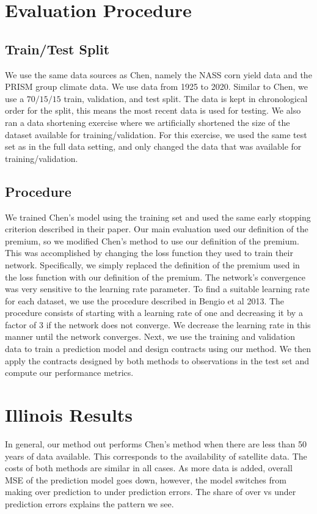 \documentclass[11pt]{article}
\begin{document}
\section{Evaluation Procedure}
  \subsection{Train/Test Split}
    We use the same data sources as Chen, namely the NASS corn yield data and the PRISM group climate data. We use data from 1925 to 2020. Similar to Chen, we use a $70/15/15$ train, validation, and test split. The data is kept in chronological order for the split, this means the most recent data is used for testing. We also ran a data shortening exercise where we artificially shortened the size of the dataset available for training/validation. For this exercise, we used the same test set as in the full data setting, and only changed the data that was available for training/validation. 

  \subsection{Procedure}
    We trained Chen's model using the training set and used the same early stopping criterion described in their paper. Our main evaluation used our definition of the premium, so we modified Chen's method to use our definition of the premium. This was accomplished by changing the loss function they used to train their network. Specifically, we simply replaced the definition of the premium used in the loss function with our definition of the premium. The network's convergence was very sensitive to the learning rate parameter. To find a suitable learning rate for each dataset, we use the procedure described in Bengio et al 2013. The procedure consists of starting with a learning rate of one and decreasing it by a factor of 3 if the network does not converge. We decrease the learning rate in this manner until the network converges. 
    Next, we use the training and validation data to train a prediction model and design contracts using our method. We then apply the contracts designed by both methods to observations in the test set and compute our performance metrics. 

\section{Illinois Results}
  In general, our method out performs Chen's method when there are less than 50 years of data available. This corresponds to the availability of satellite data. The costs of both methods are similar in all cases. As more data is added, overall MSE of the prediction model goes down, however, the model switches from making over prediction to under prediction errors. The share of over vs under prediction errors explains the pattern we see.
\end{document}
